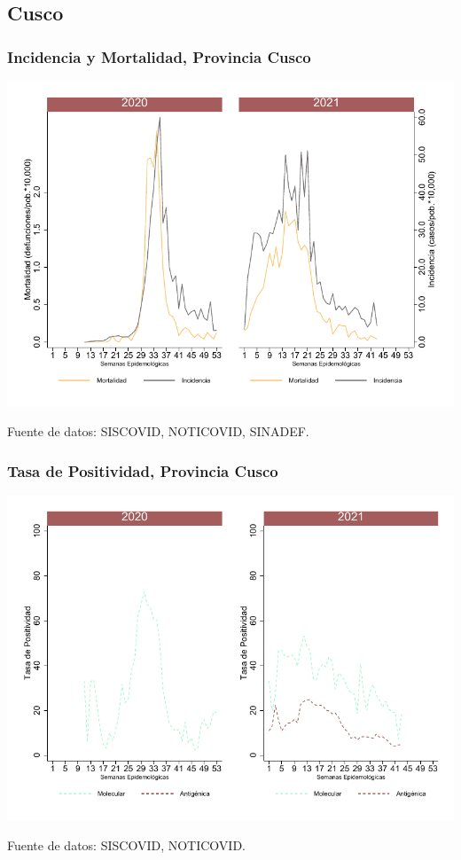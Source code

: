 \documentclass[xcolor=table]{beamer}
\begin{document}
\subsection{Cusco}

\begin{frame}[label=Cusco]
	\frametitle{Incidencia y Mortalidad, Provincia Cusco}
	\vspace{-.5cm}
	\begin{center}
		\includegraphics[width=0.8\linewidth, trim={0cm .5cm 0cm 0.2cm},clip]{../figuras/incidencia_mortalidad_20_21_7.pdf}
	\end{center}
	{\tiny Fuente de datos: SISCOVID, NOTICOVID, SINADEF.}
\end{frame}

\begin{frame}
	\frametitle{Tasa de Positividad, Provincia Cusco}
	\vspace{-.5cm}
	\begin{center}
		\includegraphics[width=0.8\linewidth, trim={0cm .5cm 0cm 0.2cm},clip]{../figuras/positividad_20_21_7.pdf}
	\end{center}
	{\tiny Fuente de datos: SISCOVID, NOTICOVID.}
\end{frame}
\end{document}
